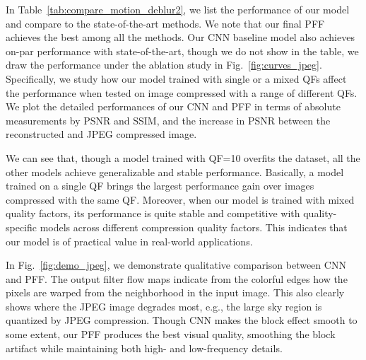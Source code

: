 \documentclass[10pt,twocolumn,letterpaper]{article}
\begin{document}
In Table~\ref{tab:compare_motion_deblur2},
we list the performance of our model and compare to the state-of-the-art methods.
We note that our final PFF achieves the best among all the methods.
Our CNN baseline model also achieves on-par performance with state-of-the-art,
though we do not show in the table, we draw the performance under the ablation
study in Fig.~\ref{fig:curves_jpeg}.
Specifically, we study how our model trained with single or a mixed QFs affect
the performance when tested on image compressed with a range of different QFs.
We plot the detailed performances of our CNN and PFF in terms of
absolute measurements by PSNR and SSIM, and the increase in PSNR between
the reconstructed and JPEG compressed image.

We can see that, though a model trained with QF=10 overfits the dataset, all
the other models achieve generalizable and stable performance.  Basically, a
model trained on a single QF brings the largest performance gain over images
compressed with the same QF.  Moreover, when our model is trained with mixed
quality factors, its performance is quite stable and competitive with
quality-specific models across different compression quality factors.  This
indicates that our model is of practical value in real-world applications.

In Fig.~\ref{fig:demo_jpeg}, we  demonstrate qualitative comparison between
CNN and PFF.  The output filter flow maps indicate from the colorful edges how
the pixels are warped from the neighborhood in the input image.  This also
clearly shows where the JPEG image degrades most, e.g., the large sky region is
quantized by JPEG compression.  Though CNN makes the block effect smooth to
some extent, our PFF produces the best visual quality, smoothing the block
artifact while maintaining both high- and low-frequency details.
\end{document}
